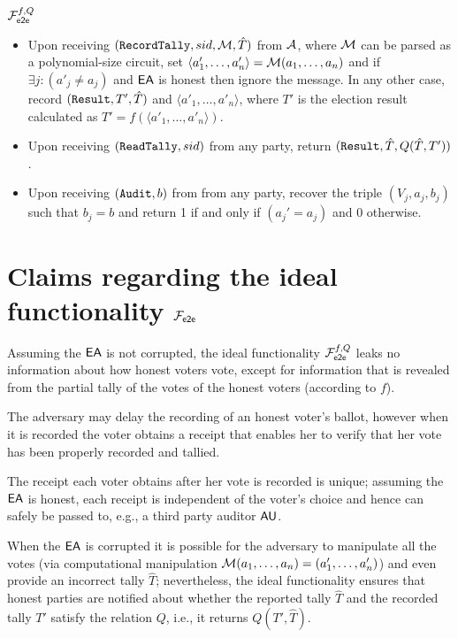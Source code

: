 \begin{nffunc}{$\mathcal{F}_{\mathsf{e2e}}^{f,Q}$}
\begin{itemize}
\item Upon receiving $(\mathtt{RecordTally}, sid, \mathcal{M}, \hat{T})$ from
  $\mathcal{A}$, where $\mathcal{M}$ can be parsed as a polynomial-size circuit,
  set $\langle a'_{1}, \ldots, a'_n \rangle = \mathcal{M}(a_1,\ldots,a_n)$
  and if $\exists j: (a'_j \neq a_j)$ and $\mathsf{EA}$ is honest then ignore
  the message. In any other case, record $(\mathtt{Result}, T', \hat{T})$ and
  $\langle a'_{1}, \ldots, a'_n \rangle$, where $T'$ is the election
  result calculated as
  $T' = f(\langle a'_{1}, \ldots, a'_n \rangle )$.

\item Upon receiving $(\mathtt{ReadTally}, sid)$ from any party, 
return $(\mathtt{Result}, \hat{T}, Q(\hat{T},T'))$.

\item Upon receiving $(\mathtt{Audit}, b)$ from  from any party, 
recover the triple $(V_j, a_j,b_j)$ such that $b_j = b$ and return 1 if and only 
if $(a_j' = a_j)$ and 0 otherwise.

\end{itemize}
\end{nffunc}

\section{Claims regarding the ideal functionality $\mathcal{F}_{\mathsf{e2e}}$}

\begin{claim}
  Assuming the $\mathsf{EA}$ is not corrupted, the ideal functionality
  $\mathcal{F}_{\mathsf{e2e}}^{f,Q}$ leaks no information about how honest voters vote,
  except for information that is revealed from the partial tally of
  the votes of the honest voters (according to $f$).
\end{claim}

\begin{claim}
  The adversary may delay the recording of an honest voter's ballot,
  however when it is recorded the voter obtains a receipt that enables
  her to verify that her vote has been properly recorded and tallied.
\end{claim}

\begin{claim}
  The receipt each voter obtains after her vote is recorded is unique;
  assuming the $\mathsf{EA}$ is honest, each receipt is independent of the
  voter's choice and hence can safely be passed to, e.g., a third
  party auditor $\mathsf{AU}$.
\end{claim}

\begin{claim}
  When the $\mathsf{EA}$ is corrupted it is possible for the adversary to
  manipulate all the votes (via computational manipulation
  $\mathcal{M}(a_1,\ldots, a_n) = (a_1', \ldots, a'_n)$) and even provide
  an incorrect tally $\hat{T}$; nevertheless, the ideal functionality
  ensures that honest parties are notified about whether the reported
  tally $\hat{T}$ and the recorded tally $T'$ satisfy the relation
  $Q$, i.e., it returns $Q(T',\hat{T})$.
\end{claim}

